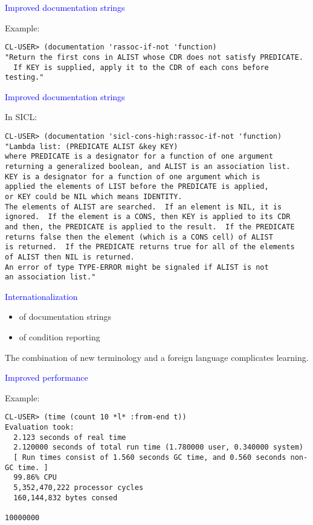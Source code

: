 \documentclass{slides}
\newcommand{\ti}[1]{\begin{center}\Large{\textcolor{blue}{#1}}\end{center}}
\begin{document}
\begin{slide}\ti{Improved documentation strings}
Example:
\small
\begin{verbatim}
CL-USER> (documentation 'rassoc-if-not 'function)
"Return the first cons in ALIST whose CDR does not satisfy PREDICATE.
  If KEY is supplied, apply it to the CDR of each cons before testing."
\end{verbatim}
\vfill\end{slide}
\begin{slide}\ti{Improved documentation strings}
In SICL:
\small
\begin{verbatim}
CL-USER> (documentation 'sicl-cons-high:rassoc-if-not 'function)
"Lambda list: (PREDICATE ALIST &key KEY)
where PREDICATE is a designator for a function of one argument
returning a generalized boolean, and ALIST is an association list.
KEY is a designator for a function of one argument which is
applied the elements of LIST before the PREDICATE is applied,
or KEY could be NIL which means IDENTITY.
The elements of ALIST are searched.  If an element is NIL, it is
ignored.  If the element is a CONS, then KEY is applied to its CDR
and then, the PREDICATE is applied to the result.  If the PREDICATE
returns false then the element (which is a CONS cell) of ALIST
is returned.  If the PREDICATE returns true for all of the elements
of ALIST then NIL is returned.
An error of type TYPE-ERROR might be signaled if ALIST is not
an association list."
\end{verbatim}
\vfill\end{slide}
\begin{slide}\ti{Internationalization}
\begin{itemize}
\item of documentation strings
\item of condition reporting
\end{itemize}

The combination of new terminology and a foreign language complicates
learning. 
\vfill\end{slide}
\begin{slide}\ti{Improved performance}
Example:
\small
\begin{verbatim}
CL-USER> (time (count 10 *l* :from-end t))
Evaluation took:
  2.123 seconds of real time
  2.120000 seconds of total run time (1.780000 user, 0.340000 system)
  [ Run times consist of 1.560 seconds GC time, and 0.560 seconds non-GC time. ]
  99.86% CPU
  5,352,470,222 processor cycles
  160,144,832 bytes consed
  
10000000
\end{verbatim}
\vfill\end{slide}
\end{document}
